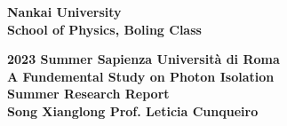 \documentclass[a4paper, 12pt]{article}
\begin{document}
\begin{titlepage}
	\begin{center}
	\textbf{\LARGE Nankai University}\\[0.5cm] 
	\textbf{\large School of Physics, Boling Class}\\[0.2cm]
	\vspace{20pt}
	\par
	\vspace{20pt}
	\textbf{\Large 2023 Summer \quad \quad Sapienza Università di Roma}\\
	\vspace{15pt}
	\myrule[1pt][7pt]
	\textbf{\LARGE A Fundemental Study on Photon Isolation}\\
	\vspace{15pt}
	\textbf{\large Summer Research Report}\\
	\myrule[1pt][7pt]
	\vspace{25pt}
	\textbf{\large Song Xianglong \hspace{20pt} Prof. Leticia Cunqueiro}\\

	\end{center}
\end{titlepage}
\newpage

\tableofcontents
\phantom{0}\\
\phantom{0}\\
\phantom{0}\\
\phantom{0}\\
\phantom{0}\\
\end{document}

